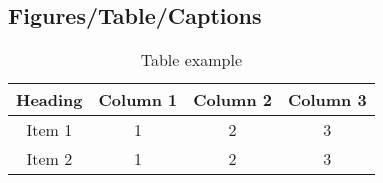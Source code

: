 
\subsection{Figures/Table/Captions}
\begin{table}[t]
\caption{Table example}
\begin{tabular}{c c c c}
\hline
Heading & Column 1 & Column 2 & Column 3\\
\hline
Item 1 & 1 & 2 & 3 \\
Item 2 & 1 & 2 & 3 \\
\hline
\end{tabular}
\label{tab:01}
\end{table}